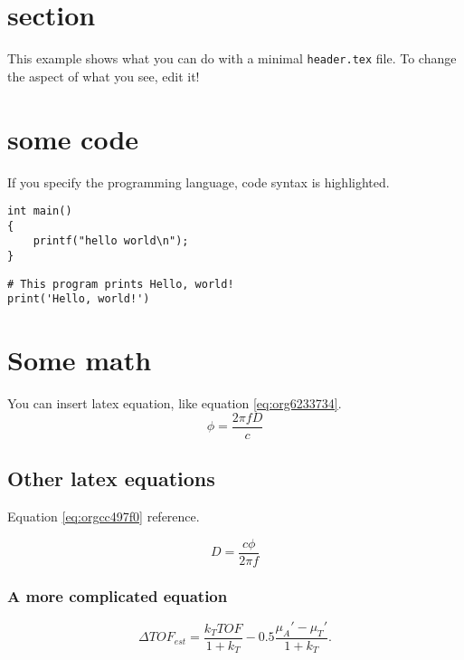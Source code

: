 


\maketitle

\newpage

\section{section}
\label{sec:orgd9d9bc1}
This example shows what you can do with a minimal \texttt{header.tex} file.
To change the aspect of what you see, edit it!

\section{some code}
\label{sec:orge49e183}
If you specify the programming language, code syntax is highlighted.
\begin{verbatim}
int main()
{
    printf("hello world\n");
}
\end{verbatim}

\begin{verbatim}
# This program prints Hello, world!
print('Hello, world!')
\end{verbatim}

\section{Some math}
\label{sec:orgdb7147f}
You can insert latex equation, like equation \ref{eq:org6233734}.
\begin{equation}
\label{eq:org6233734}
\phi = \frac{2\pi fD}{c}
\end{equation}
\subsection{Other latex equations}
\label{sec:org94be09b}
Equation \ref{eq:orgcc497f0} reference.

\begin{equation}
\label{eq:orgcc497f0}
D = \frac{c\phi}{2\pi f}
\end{equation}

\subsubsection{A more complicated equation}
\label{sec:org59c7b3f}

\begin{equation}
\Delta TOF_{est} = \frac{k_T TOF}{1+k_T } - 0.5 \frac{\mu_A' - \mu_T'}{1+k_T}.
\end{equation}


